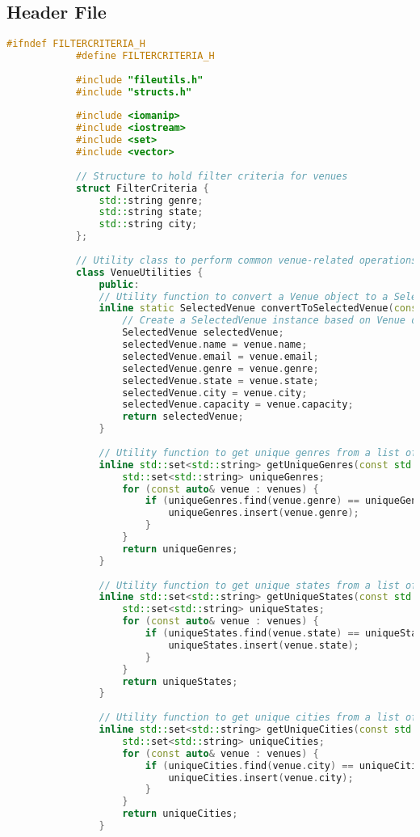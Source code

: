 \documentclass{article}
\begin{document}
	\subsection*{Header File}
	\begin{mdframed}[backgroundcolor=background, hidealllines=false, innerleftmargin=15pt, innerrightmargin=5pt, innertopmargin=0pt, innerbottommargin=-5pt, linecolor=accent]
		\begin{lstlisting}[language=C++]
			#ifndef FILTERCRITERIA_H
			#define FILTERCRITERIA_H
			
			#include "fileutils.h"
			#include "structs.h"
			
			#include <iomanip>
			#include <iostream>
			#include <set>
			#include <vector>
			
			// Structure to hold filter criteria for venues
			struct FilterCriteria {
				std::string genre;
				std::string state;
				std::string city;
			};
			
			// Utility class to perform common venue-related operations
			class VenueUtilities {
				public:
				// Utility function to convert a Venue object to a SelectedVenue object
				inline static SelectedVenue convertToSelectedVenue(const Venue& venue) {
					// Create a SelectedVenue instance based on Venue data
					SelectedVenue selectedVenue;
					selectedVenue.name = venue.name;
					selectedVenue.email = venue.email;
					selectedVenue.genre = venue.genre;
					selectedVenue.state = venue.state;
					selectedVenue.city = venue.city;
					selectedVenue.capacity = venue.capacity;
					return selectedVenue;
				}
				
				// Utility function to get unique genres from a list of venues
				inline std::set<std::string> getUniqueGenres(const std::vector<Venue>& venues) {
					std::set<std::string> uniqueGenres;
					for (const auto& venue : venues) {
						if (uniqueGenres.find(venue.genre) == uniqueGenres.end()) {
							uniqueGenres.insert(venue.genre);
						}
					}
					return uniqueGenres;
				}
				
				// Utility function to get unique states from a list of venues
				inline std::set<std::string> getUniqueStates(const std::vector<Venue>& venues) {
					std::set<std::string> uniqueStates;
					for (const auto& venue : venues) {
						if (uniqueStates.find(venue.state) == uniqueStates.end()) {
							uniqueStates.insert(venue.state);
						}
					}
					return uniqueStates;
				}
				
				// Utility function to get unique cities from a list of venues
				inline std::set<std::string> getUniqueCities(const std::vector<Venue>& venues) {
					std::set<std::string> uniqueCities;
					for (const auto& venue : venues) {
						if (uniqueCities.find(venue.city) == uniqueCities.end()) {
							uniqueCities.insert(venue.city);
						}
					}
					return uniqueCities;
				}
				

\end{lstlisting}
\end{mdframed}
\end{document}
